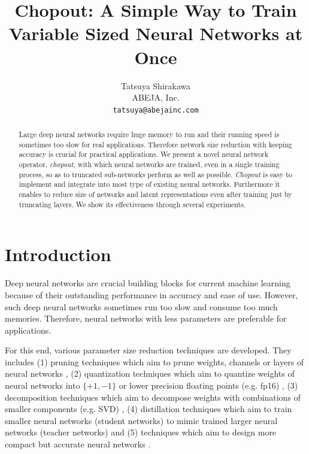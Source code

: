 \documentclass{article}
\title{Chopout: A Simple Way to Train Variable Sized Neural Networks at Once}
\author{
      Tatsuya Shirakawa \\
      ABEJA, Inc. \\
      \texttt{tatsuya@abejainc.com}
    }
\begin{document}
    
    \maketitle
    
    \begin{abstract}
      Large deep neural networks require huge memory to run and their running speed is sometimes too slow for real applications. Therefore network size reduction with keeping accuracy is crucial for practical applications. We present a novel neural network operator, \textit{chopout}, with which neural networks are trained, even in a single training process, so as to truncated sub-networks perform as well as possible. \textit{Chopout} is easy to implement and integrate into most type of existing neural networks. Furthermore it enables to reduce size of networks and latent representations even after training just by truncating layers. We show its effectiveness through several experiments.
    \end{abstract}
    
    \section{Introduction}
    
    Deep neural networks are crucial building blocks for current machine learning because of their outstanding performance in accuracy and ease of use. However, such deep neural networks sometimes run too slow and consume too much memories. Therefore, neural networks with less parameters are preferable for applications.
    
    For this end, various parameter size reduction techniques are developed. They includes 
    (1) pruning techniques which aim to prune weights, channels or layers of neural networks \cite{han2015deep, aghasi2017nettrim, dong2017learning, molchanov2016pruning, li2017pruning, luo2017thinet, ye2018rethinking, liu2017learning, he2017channel}, 
    (2) quantization techniques which aim to quantize weights of neural networks into $\{+1, -1\}$ or lower precision floating points (e.g. fp16) \cite{han2015learning, courbariaux2015binaryconnect, rastegari2016xnor, zhou2016dorefa, zhu2016trained,  wu2016quantized, hubara2017quantized}, 
    (3) decomposition techniques which aim to decompose weights with combinations of smaller components (e.g. SVD) \cite{denton2014exploiting, jaderberg2014speeding, lebedev2014speeding, yang2015deep, novikov2015tensorizing}, 
    (4) distillation techniques which aim to train smaller neural networks (student networks) to mimic trained larger neural networks (teacher networks) \cite{hinton2015distilling, mishra2017apprentice, polino2018model} and 
    (5) techniques which aim to design more compact but accurate neural networks \cite{iandola2016squeezenet, howard2017mobilenet, sandler2018mobilenetv2, zhang2017shufflenet}.
\end{document}
